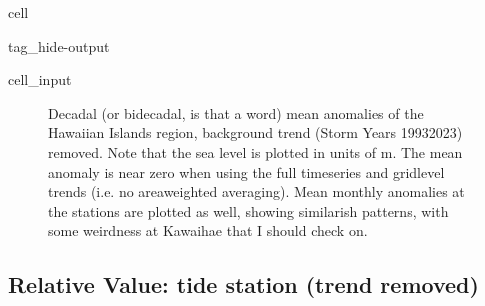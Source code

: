 \documentclass[letterpaper,10pt,english]{jupyterBook}
\begin{document}
\begin{sphinxuseclass}{cell}
\begin{sphinxuseclass}{tag_hide-output}
\begin{sphinxVerbatimInput}
\begin{sphinxuseclass}{cell_input}
\begin{sphinxVerbatim}[commandchars=\\\{\}]
       
       
    



   


\end{sphinxVerbatim}

\end{sphinxuseclass}\end{sphinxVerbatimInput}

\end{sphinxuseclass}
\end{sphinxuseclass}
\begin{figure}[htbp]
\centering
\capstart

\noindent{}
\caption{Decadal (or bidecadal, is that a word) mean anomalies of the Hawaiian Islands region, background trend (Storm Years 1993\sphinxhyphen{}2023) removed. Note that the sea level is plotted in units of m. The mean anomaly is near zero when using the full timeseries and grid\sphinxhyphen{}level trends (i.e. no area\sphinxhyphen{}weighted averaging). Mean monthly anomalies at the stations are plotted as well, showing similar\sphinxhyphen{}ish patterns, with some weirdness at Kawaihae that I should check on.}\label{\detokenize{notebooks/regional_and_local/SL_anomaly_annual:sl-yma-decadal}}\end{figure}


\subsection{Relative Value: tide station (trend removed)}
\label{\detokenize{notebooks/regional_and_local/SL_anomaly_annual:relative-value-tide-station-trend-removed}}
\end{document}

